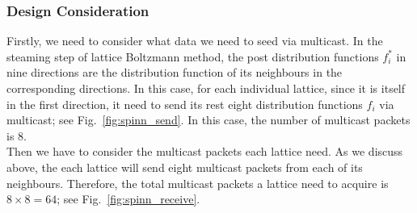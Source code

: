 \subsubsection{Design Consideration}
Firstly, we need to consider what data we need to seed via multicast. In the steaming step of lattice Boltzmann method, the post distribution functions $f_i^*$ in nine directions are the distribution function of its neighbours in the corresponding directions. In this case, for each individual lattice, since it is itself in the first direction, it need to send its rest eight distribution functions $f_i$ via multicast; see Fig.~\ref{fig:spinn_send}. In this case, the number of multicast packets is 8.\\

Then we have to consider the multicast packets each lattice need. As we discuss above, the each lattice will send eight multicast packets from each of its neighbours. Therefore, the total multicast packets a lattice need to acquire is $8 \times 8 = 64$; see Fig.~\ref{fig:spinn_receive}.\\

